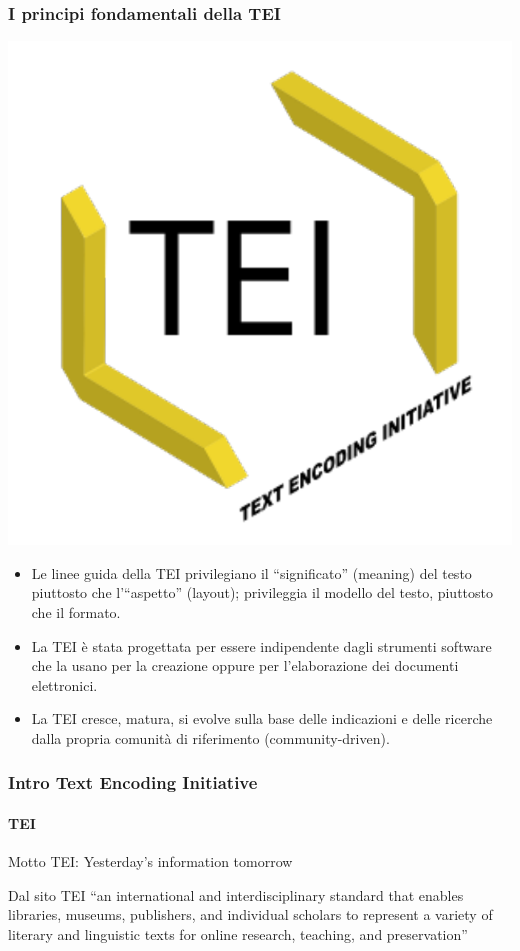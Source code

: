 \begin{frame}
	\frametitle{I principi fondamentali della TEI}
	\addtocounter{nframe}{1}
    
    \begin{center}
	    \includegraphics[width=.2\textwidth]{../imgs/tei-r.pdf}
	\end{center}

    \begin{itemize}
        
        \item<1-> Le linee guida della TEI privilegiano il ``significato'' (meaning) del testo piuttosto che l'``aspetto'' (layout); privileggia il modello del testo, piuttosto che il formato.
          
        \item<2-> La TEI è stata progettata per essere indipendente dagli strumenti software che la usano per la creazione oppure per l'elaborazione dei documenti elettronici.

        \item<3-> La TEI cresce, matura, si evolve sulla base delle indicazioni e delle ricerche dalla propria comunità di riferimento (community-driven).
           
    \end{itemize}
    
\end{frame}



\begin{frame}
	\frametitle{Intro Text Encoding Initiative}
	\framesubtitle{TEI}
	\addtocounter{nframe}{1}

	\begin{block}{Motto}
		TEI: Yesterday's information tomorrow
	\end{block}

	\begin{block}{Dal sito TEI}
		“an international and interdisciplinary standard that
		enables libraries, museums, publishers, and individual
		scholars to represent a variety of literary and linguistic
		texts for online research, teaching, and preservation”
	\end{block}
\end{frame}


